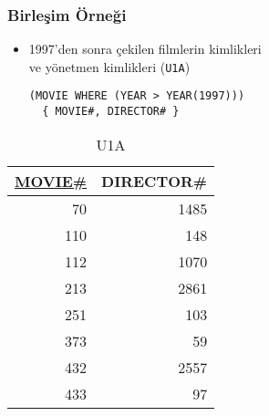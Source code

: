 \documentclass[dvipsnames]{beamer}
\theoremstyle{plain}
\begin{document}
\begin{frame}[fragile]
  \frametitle{Birleşim Örneği}

    \begin{itemize}
      \item 1997'den sonra çekilen filmlerin kimlikleri\\
        ve yönetmen kimlikleri (\texttt{U1A})

    \begin{lstlisting}
(MOVIE WHERE (YEAR > YEAR(1997)))
  { MOVIE#, DIRECTOR# }
    \end{lstlisting}
    \end{itemize}

    \vspace{-10pt}
    \begin{tiny}
    \begin{table}
      \caption{U1A}
      \begin{tabular}{|r|r|}\hline
\underline{MOVIE\#} & DIRECTOR\#\\[2pt]\hline\hline
 70 &       1485\\\hline
110 &        148\\\hline
112 &       1070\\\hline
213 &       2861\\\hline
251 &        103\\\hline
373 &         59\\\hline
432 &       2557\\\hline
433 &         97\\\hline
      \end{tabular}
    \end{table}
    \end{tiny}
\end{frame}
\end{document}
